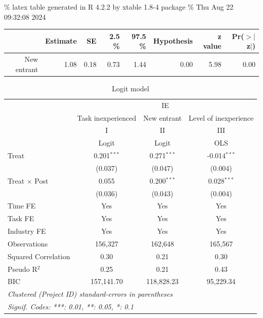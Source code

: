 \documentclass[
]{article}
\begin{document}
\% latex table generated in R 4.2.2 by xtable 1.8-4 package \% Thu Aug
22 09:32:08 2024

\begin{table}[ht]
\centering
\begin{tabular}{rrrrrrrr}
  \hline
 & Estimate & SE & 2.5 \% & 97.5 \% & Hypothesis & z value & Pr($>$$|$z$|$) \\ 
  \hline
New entrant & 1.08 & 0.18 & 0.73 & 1.44 & 0.00 & 5.98 & 0.00 \\ 
   \hline
\end{tabular}
\end{table}

\begin{table}[htbp]
   \caption{Logit model}
   \centering
   \small
   \begin{tabular}{lccc}
      \toprule
       & \multicolumn{3}{c}{IE}\\
                           & Task inexperienced & New entrant   & Level of inexperience \\   
                           & I                  & II            & III\\  
                           &  Logit             & Logit         & OLS\\  
      Treat                & 0.201$^{***}$      & 0.271$^{***}$ & -0.014$^{***}$\\   
                           & (0.037)            & (0.047)       & (0.004)\\   
      Treat $\times$ Post  & 0.055              & 0.200$^{***}$ & 0.028$^{***}$\\   
                           & (0.036)            & (0.043)       & (0.004)\\   
      Time FE              & Yes                & Yes           & Yes\\  
      Task FE              & Yes                & Yes           & Yes\\  
      Industry FE          & Yes                & Yes           & Yes\\  
      Observations         & 156,327            & 162,648       & 165,567\\  
      Squared Correlation  & 0.30               & 0.21          & 0.30\\  
      Pseudo R$^2$         & 0.25               & 0.21          & 0.43\\  
      BIC                  & 157,141.70         & 118,828.23    & 95,229.34\\  
      \midrule
      \multicolumn{4}{l}{\emph{Clustered (Project ID) standard-errors in parentheses}}\\
      \multicolumn{4}{l}{\emph{Signif. Codes: ***: 0.01, **: 0.05, *: 0.1}}\\
   \end{tabular}
\end{table}
\end{document}
